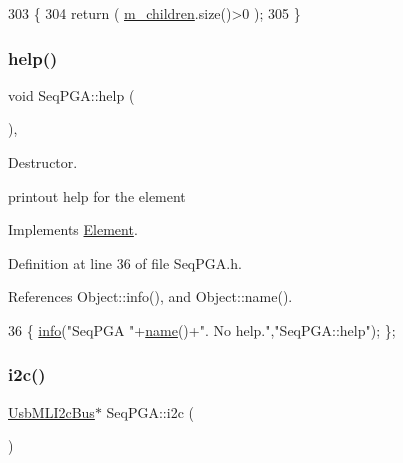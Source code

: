 \begin{DoxyCode}
303                               \{
304   \textcolor{keywordflow}{return} ( \hyperlink{classHierarchy_a038816763941fd4a930504917f60483b}{m\_children}.size()>0 );
305 \}
\end{DoxyCode}
\mbox{\label{classSeqPGA_ae651bb2d5ac33e863951499c638655fe}} 
\subsubsection{\texorpdfstring{help()}{help()}}
{\footnotesize\ttfamily void Seq\+P\+G\+A\+::help (\begin{DoxyParamCaption}{ }\end{DoxyParamCaption})\hspace{0.3cm}{\ttfamily [inline]}, {\ttfamily [virtual]}}



Destructor. 

printout help for the element 

Implements \hyperlink{classElement_a32c0de27acb08e17251cef88c3e9303a}{Element}.



Definition at line 36 of file Seq\+P\+G\+A.\+h.



References Object\+::info(), and Object\+::name().


\begin{DoxyCode}
36 \{ \hyperlink{classObject_a644fd329ea4cb85f54fa6846484b84a8}{info}(\textcolor{stringliteral}{"SeqPGA "}+\hyperlink{classObject_a300f4c05dd468c7bb8b3c968868443c1}{name}()+\textcolor{stringliteral}{". No help."},\textcolor{stringliteral}{"SeqPGA::help"}); \};
\end{DoxyCode}
\mbox{\label{classSeqPGA_ad1629388bbd38b013110ee03a1eea339}} 
\subsubsection{\texorpdfstring{i2c()}{i2c()}}
{\footnotesize\ttfamily \hyperlink{classUsbMLI2cBus}{Usb\+M\+L\+I2c\+Bus}$\ast$ Seq\+P\+G\+A\+::i2c (\begin{DoxyParamCaption}{ }\end{DoxyParamCaption})\hspace{0.3cm}{\ttfamily [inline]}}



